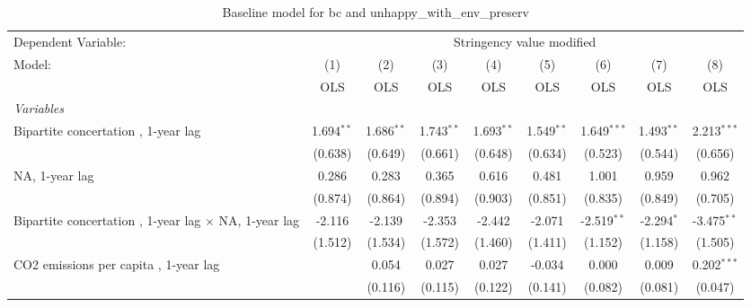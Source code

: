 
\begin{table}[htbp]
   \caption{Baseline model for bc and unhappy\_with\_env\_preserv}
   \centering
   \begin{tabular}{lcccccccc}
      \toprule
      Dependent Variable: & \multicolumn{8}{c}{Stringency value modified}\\
      Model:                                                       & (1)          & (2)          & (3)          & (4)          & (5)          & (6)           & (7)           & (8)\\  
                                                                   &  OLS         & OLS          & OLS          & OLS          & OLS          & OLS           & OLS           & OLS\\  
      \midrule
      \emph{Variables}\\
      Bipartite concertation , 1-year lag                          & 1.694$^{**}$ & 1.686$^{**}$ & 1.743$^{**}$ & 1.693$^{**}$ & 1.549$^{**}$ & 1.649$^{***}$ & 1.493$^{**}$  & 2.213$^{***}$\\   
                                                                   & (0.638)      & (0.649)      & (0.661)      & (0.648)      & (0.634)      & (0.523)       & (0.544)       & (0.656)\\   
      NA, 1-year lag                                               & 0.286        & 0.283        & 0.365        & 0.616        & 0.481        & 1.001         & 0.959         & 0.962\\   
                                                                   & (0.874)      & (0.864)      & (0.894)      & (0.903)      & (0.851)      & (0.835)       & (0.849)       & (0.705)\\   
      Bipartite concertation , 1-year lag $\times$ NA, 1-year lag  & -2.116       & -2.139       & -2.353       & -2.442       & -2.071       & -2.519$^{**}$ & -2.294$^{*}$  & -3.475$^{**}$\\   
                                                                   & (1.512)      & (1.534)      & (1.572)      & (1.460)      & (1.411)      & (1.152)       & (1.158)       & (1.505)\\   
      CO2 emissions per capita , 1-year lag                        &              & 0.054        & 0.027        & 0.027        & -0.034       & 0.000         & 0.009         & 0.202$^{***}$\\   
                                                                   &              & (0.116)      & (0.115)      & (0.122)      & (0.141)      & (0.082)       & (0.081)       & (0.047)\\   

\end{tabular}
\end{table}
